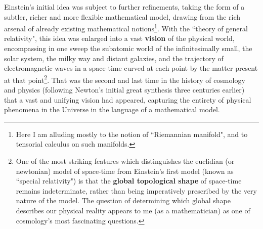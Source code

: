 Einstein's initial idea was subject to further refinements, taking the form of a subtler, richer and more flexible mathematical model, drawing from the rich arsenal of already existing mathematical notions\footnote{Here I am alluding mostly to the notion of ``Riemannian manifold", and to tensorial calculus on such manifolds.}. With the ``theory of general relativity", this idea was enlarged into a vast \textbf{vision} of the physical world, encompassing in one sweep the subatomic world of the infinitesimally small, the solar system, the milky way and distant galaxies, and the trajectory of electromagnetic waves in a space-time curved at each point by the matter present at that point\footnote{One of the most striking features which distinguishes the euclidian (or newtonian) model of space-time from Einstein's first model (known as ``special relativity") is that the \textbf{global topological shape} of space-time remains indeterminate, rather than being imperatively prescribed by the very nature of the model. The question of determining which global shape describes our physical reality appears to me (as a mathematician) as one of cosmology's most fascinating questions.}. That was the second and last time in the history of cosmology and physics (following Newton's initial great synthesis three centuries earlier) that a vast and unifying vision had appeared, capturing the entirety of physical phenomena in the Universe in the language of a mathematical model.

